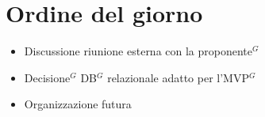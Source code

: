 \section*{Ordine del giorno}

\begin{itemize}
	\item Discussione riunione esterna con la proponente$^G$
	\item Decisione$^G$ DB$^G$ relazionale adatto per l'MVP$^G$
	\item Organizzazione futura
\end{itemize}

